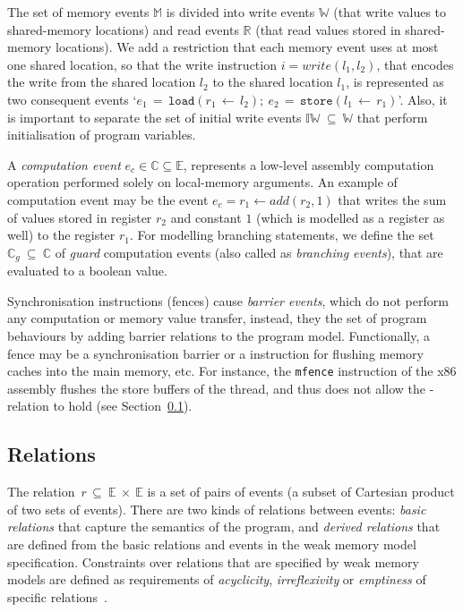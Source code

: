 The set of memory events $\mathbb{M}$ is divided into write events $\mathbb{W}$ (that write values to shared-memory locations) and read events $\mathbb{R}$ (that read values stored in shared-memory locations).
We add a restriction that each memory event uses at most one shared location, so that the write instruction $i = write(l_1, l_2)$, that encodes the write from the shared location $l_2$ to the shared location $l_1$, is represented as two consequent events `$e_1\,=\,{\texttt{load}(r_1\,\leftarrow\,l_2)}; \ e_2\,=\,{\texttt{store}(l_1\,\leftarrow\,r_1)}$'.
Also, it is important to separate the set of initial write events $\mathbb{IW}~\subseteq~\mathbb{W}$ that perform initialisation of program variables.

A \textit{computation event} $e_c \in \mathbb{C} \subseteq \mathbb{E}$, represents a low-level assembly computation operation performed solely on local-memory arguments.
An example of computation event may be the event $e_c = r_1 \leftarrow add(r_2, 1)$ that writes the sum of values stored in register $r_2$ and constant $1$ (which is modelled as a register as well) to the register $r_1$.
For modelling branching statements, we define the set $\mathbb{C}_{g}~\subseteq~\mathbb{C}$ of \textit{guard} computation events (also called as \textit{branching events}), that are evaluated to a boolean value.

Synchronisation instructions (fences) cause \textit{barrier events}, which do not perform any computation or memory value transfer, instead, they the set of program behaviours by adding barrier relations to the program model.
Functionally, a fence may be a synchronisation barrier or a instruction for flushing memory caches into the main memory, etc.
For instance, the \texttt{mfence} instruction of the x86 assembly flushes the store buffers of the thread, and thus does not allow the \rf-relation to hold (see Section~\ref{ch:wmm:model:relations}).


\subsection{Relations}
\label{ch:wmm:model:relations}


The relation~$r\,\subseteq~\mathbb{E}~\times~\mathbb{E}$ is a set of pairs of events (a subset of Cartesian product of two sets of events). There are two kinds of relations between events: \textit{basic relations} that capture the semantics of the program, and \textit{derived relations} that are defined from the basic relations and events in the weak memory model specification. Constraints over relations that are specified by weak memory models are defined as requirements of \textit{acyclicity}, \textit{irreflexivity} or \textit{emptiness} of specific relations~\cite{alglave2016syntax}.

